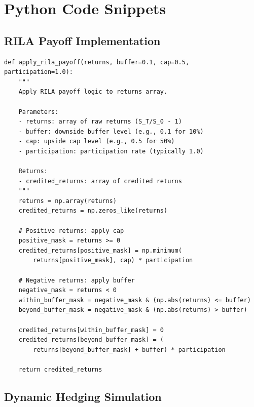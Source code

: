 \documentclass[12pt,a4paper]{report}
\begin{document}
\appendix

\chapter{Python Code Snippets}

\section{RILA Payoff Implementation}

\begin{verbatim}
def apply_rila_payoff(returns, buffer=0.1, cap=0.5, participation=1.0):
    """
    Apply RILA payoff logic to returns array.
    
    Parameters:
    - returns: array of raw returns (S_T/S_0 - 1)
    - buffer: downside buffer level (e.g., 0.1 for 10%)
    - cap: upside cap level (e.g., 0.5 for 50%)
    - participation: participation rate (typically 1.0)
    
    Returns:
    - credited_returns: array of credited returns
    """
    returns = np.array(returns)
    credited_returns = np.zeros_like(returns)
    
    # Positive returns: apply cap
    positive_mask = returns >= 0
    credited_returns[positive_mask] = np.minimum(
        returns[positive_mask], cap) * participation
    
    # Negative returns: apply buffer
    negative_mask = returns < 0
    within_buffer_mask = negative_mask & (np.abs(returns) <= buffer)
    beyond_buffer_mask = negative_mask & (np.abs(returns) > buffer)
    
    credited_returns[within_buffer_mask] = 0
    credited_returns[beyond_buffer_mask] = (
        returns[beyond_buffer_mask] + buffer) * participation
    
    return credited_returns
\end{verbatim}

\section{Dynamic Hedging Simulation}
\end{document}
